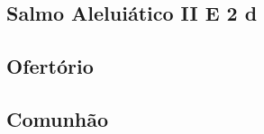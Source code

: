 \AllowPageFlush

\subsection[Salmo Aleluiático II]{Salmo Aleluiático II \textmd{E 2 d}}\label{subsection:missae-pro-varii-necessitatibus/in-quacumque-necessitate/psalmus-alleluiaticus-2}

\AllowPageFlush

\subsection{Ofertório}\label{subsection:missae-pro-varii-necessitatibus/in-quacumque-necessitate/offertorium}

\AllowPageFlush

\subsection{Comunhão}\label{subsection:missae-pro-varii-necessitatibus/in-quacumque-necessitate/communio}
